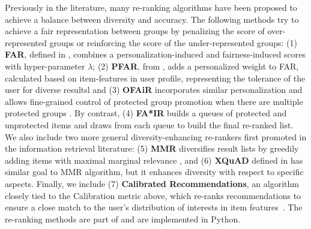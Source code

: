 Previously in the literature, many re-ranking algorithms have been proposed to achieve a balance between diversity and accuracy. The following methods try to achieve a fair representation between groups by penalizing the score of over-represented groups or reinforcing the score of the under-represented groups: (1) \textbf{FAR}, defined in \cite{liu2019farpfar}, combines a personalization-induced and fairness-induced scores with hyper-parameter $\lambda$; (2) \textbf{PFAR}, from \cite{liu2019farpfar}, adds a personalized weight to FAR, calculated based on item-features in user profile, representing the tolerance of the user for diverse resultsl and (3) \textbf{OFAiR} incorporates similar personalization and allows fine-grained control of protected group promotion when there are multiple protected groups \cite{sonboli2020opportunistic}. By contrast, (4) \textbf{FA*IR} \cite{zehlike2017fa} builds a queues of protected and unprotected items and draws from each queue to build the final re-ranked list. We also include two more general diversity-enhancing re-rankers first promoted in the information retrieval literature: (5) \textbf{MMR} diversifies result lists by greedily adding items with maximal marginal relevance \cite{carbonell1998use}, and (6) \textbf{XQuAD} defined in \cite{santos2010explicit} has similar goal to MMR algorithm, but it enhances diversity with respect to specific aspects. Finally, we include (7) \textbf{Calibrated Recommendations}, an algorithm closely tied to the Calibration metric above, which re-ranks recommendations to ensure a close match to the user's distribution of interests in item features~\cite{steck2018calibrated}. The re-ranking methods are part of \libauto{} and are implemented in Python.

